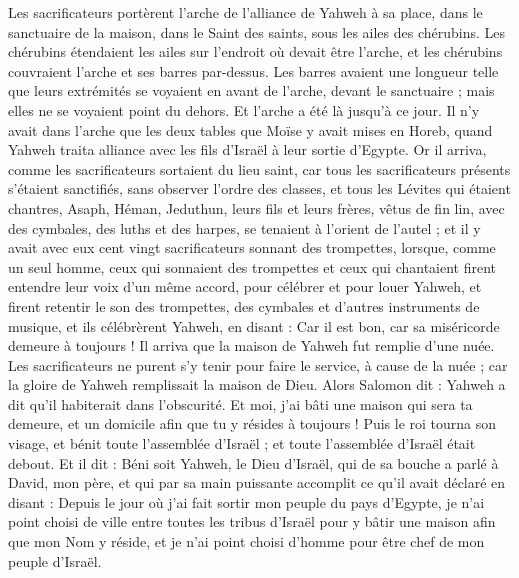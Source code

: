 \begin{multicols}{2}
Les sacrificateurs portèrent l'arche de l'alliance de Yahweh à sa place, dans le sanctuaire de la maison, dans le Saint des saints, sous les ailes des chérubins.
Les chérubins étendaient les ailes sur l'endroit où devait être l'arche, et les chérubins couvraient l'arche et ses barres par-dessus.
Les barres avaient une longueur telle que leurs extrémités se voyaient en avant de l'arche, devant le sanctuaire ; mais elles ne se voyaient point du dehors. Et l'arche a été là jusqu'à ce jour.
Il n'y avait dans l'arche que les deux tables que Moïse y avait mises en Horeb, quand Yahweh traita alliance avec les fils d’Israël à leur sortie d'Egypte.
Or il arriva, comme les sacrificateurs sortaient du lieu saint, car tous les sacrificateurs présents s'étaient sanctifiés, sans observer l'ordre des classes,
et tous les Lévites qui étaient chantres, Asaph, Héman, Jeduthun, leurs fils et leurs frères, vêtus de fin lin, avec des cymbales, des luths et des harpes, se tenaient à l'orient de l'autel ; et il y avait avec eux cent vingt sacrificateurs sonnant des trompettes,
lorsque, comme un seul homme, ceux qui sonnaient des trompettes et ceux qui chantaient firent entendre leur voix d'un même accord, pour célébrer et pour louer Yahweh, et firent retentir le son des trompettes, des cymbales et d'autres instruments de musique, et ils célébrèrent Yahweh, en disant : Car il est bon, car sa miséricorde demeure à toujours ! Il arriva que la maison de Yahweh fut remplie d'une nuée.
Les sacrificateurs ne purent s'y tenir pour faire le service, à cause de la nuée ; car la gloire de Yahweh remplissait la maison de Dieu.
\VerseOne{}Alors Salomon dit : Yahweh a dit qu'il habiterait dans l'obscurité.
Et moi, j'ai bâti une maison qui sera ta demeure, et un domicile afin que tu y résides à toujours !
Puis le roi tourna son visage, et bénit toute l'assemblée d'Israël ; et toute l'assemblée d'Israël était debout.
Et il dit : Béni soit Yahweh, le Dieu d'Israël, qui de sa bouche a parlé à David, mon père, et qui par sa main puissante accomplit ce qu'il avait déclaré en disant :
Depuis le jour où j'ai fait sortir mon peuple du pays d'Egypte, je n'ai point choisi de ville entre toutes les tribus d'Israël pour y bâtir une maison afin que mon Nom y réside, et je n'ai point choisi d'homme pour être chef de mon peuple d'Israël.

\end{multicols}

